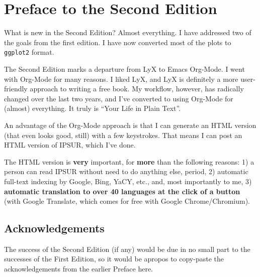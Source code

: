 %
%

\cleardoublepage
{}
{}

\chapter*{Preface to the Second Edition}

What is new in the Second Edition?  Almost everything.  I have addressed two of the goals from the first edition.  I have now converted most of the plots to \texttt{ggplot2} format. 

The Second Edition marks a departure from LyX to Emacs Org-Mode.  I went with Org-Mode for many reasons.  I liked LyX, and LyX is definitely a more user-friendly approach to writing a free book.  My workflow, however, has radically changed over the last two years, and I've converted to using Org-Mode for (almost) everything.  It truly is ``Your Life in Plain Text''.

An advantage of the Org-Mode approach is that I can generate an HTML version (that even looks good, still) with a few keystrokes.  That means I can post an HTML version of IPSUR, which I've done.  

The HTML version is \textbf{very} important, for \textbf{more} than the following reasons:  1) a person can read IPSUR without need to do anything else, period, 2) automatic full-text indexing by Google, Bing, YaCY, etc., and, most importantly to me, 3) \textbf{automatic translation to over 40 languages at the click of a button} (with Google Translate, which comes for free with Google Chrome/Chromium).


\section*{Acknowledgements}

The success of the Second Edition (if any) would be due in no small part to the successes of the First Edition, so it would be apropos to copy-paste the acknowledgements from the earlier Preface here.


